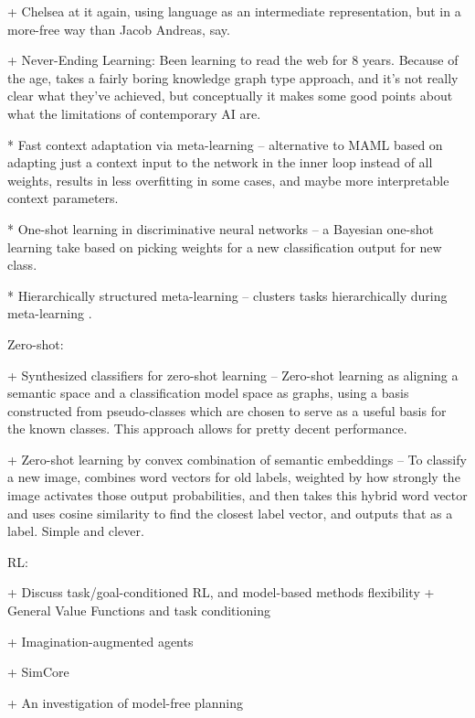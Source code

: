 + Chelsea at it again, using language as an intermediate representation, but in a more-free way than Jacob Andreas, say. \citep{Jiang2019}

+ Never-Ending Learning: Been learning to read the web for 8 years. Because of the age, takes a fairly boring knowledge graph type approach, and it's not really clear what they've achieved, but conceptually it makes some good points about what the limitations of contemporary AI are. \citep{Mitchell2018}

* Fast context adaptation via meta-learning -- alternative to MAML based on adapting just a context input to the network in the inner loop instead of all weights, results in less overfitting in some cases, and maybe more interpretable context parameters. \citep{Zintgraf2018}

* One-shot learning in discriminative neural networks -- a Bayesian one-shot learning take based on picking weights for a new classification output for new class. \citep{Burgess2016}

* Hierarchically structured meta-learning -- clusters tasks hierarchically during meta-learning \citep{Yao2019}.



Zero-shot:

+ Synthesized classifiers for zero-shot learning -- Zero-shot learning as aligning a semantic space and a classification model space as graphs, using a basis constructed from pseudo-classes which are chosen to serve as a useful basis for the known classes. This approach allows for pretty decent performance. \citep{Changpinyo2016} 

+ Zero-shot learning by convex combination of semantic embeddings -- To classify a new image, combines word vectors for old labels, weighted by how strongly the image activates those output probabilities, and then takes this hybrid word vector and uses cosine similarity to find the closest label vector, and outputs that as a label. Simple and clever. \citep{Norouzi2014}



RL:

+ Discuss task/goal-conditioned RL, and model-based methods flexibility
    + General Value Functions and task conditioning \citep{Sutton2011}

+ Imagination-augmented agents \citep{Racaniere2017}

+ SimCore

+ An investigation of model-free planning \citep{Guez2019}

